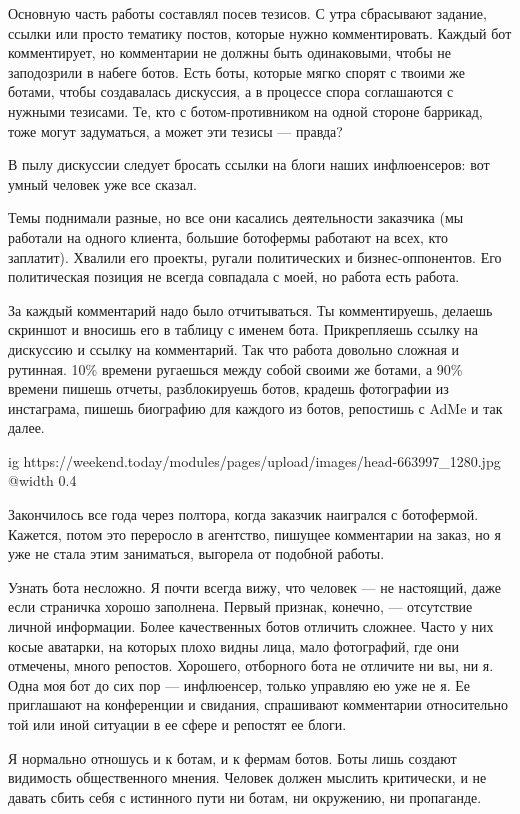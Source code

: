 \begin{itemize}
\begin{multicols}{2}
Основную часть работы составлял посев тезисов. С утра сбрасывают задание,
ссылки или просто тематику постов, которые нужно комментировать. Каждый бот
комментирует, но комментарии не должны быть одинаковыми, чтобы не заподозрили в
набеге ботов. Есть боты, которые мягко спорят с твоими же ботами, чтобы
создавалась дискуссия, а в процессе спора соглашаются с нужными тезисами. Те,
кто с ботом-противником на одной стороне баррикад, тоже могут задуматься, а
может эти тезисы — правда?

В пылу дискуссии следует бросать ссылки на блоги наших инфлюенсеров: вот умный
человек уже все сказал.

Темы поднимали разные, но все они касались деятельности заказчика (мы работали
на одного клиента, большие ботофермы работают на всех, кто заплатит). Хвалили
его проекты, ругали политических и бизнес-оппонентов. Его политическая позиция
не всегда совпадала с моей, но работа есть работа.

За каждый комментарий надо было отчитываться. Ты комментируешь, делаешь
скриншот и вносишь его в таблицу с именем бота. Прикрепляешь ссылку на
дискуссию и ссылку на комментарий. Так что работа довольно сложная и рутинная.
10\% времени ругаешься между собой своими же ботами, а 90\% времени пишешь
отчеты, разблокируешь ботов, крадешь фотографии из инстаграма, пишешь биографию
для каждого из ботов, репостишь с AdMe и так далее.

\ifcmt
  ig https://weekend.today/modules/pages/upload/images/head-663997_1280.jpg
  @width 0.4
\fi

Закончилось все года через полтора, когда заказчик наигрался с ботофермой.
Кажется, потом это переросло в агентство, пишущее комментарии на заказ, но я
уже не стала этим заниматься, выгорела от подобной работы.

Узнать бота несложно. Я почти всегда вижу, что человек — не настоящий, даже
если страничка хорошо заполнена. Первый признак, конечно, — отсутствие личной
информации. Более качественных ботов отличить сложнее. Часто у них косые
аватарки, на которых плохо видны лица, мало фотографий, где они отмечены, много
репостов. Хорошего, отборного бота не отличите ни вы, ни я. Одна моя бот до сих
пор — инфлюенсер, только управляю ею уже не я. Ее приглашают на конференции и
свидания, спрашивают комментарии относительно той или иной ситуации в ее сфере
и репостят ее блоги.

Я нормально отношусь и к ботам, и к фермам ботов. Боты лишь создают видимость
общественного мнения. Человек должен мыслить критически, и не давать сбить себя
с истинного пути ни ботам, ни окружению, ни пропаганде.


\end{multicols}
\end{itemize}
